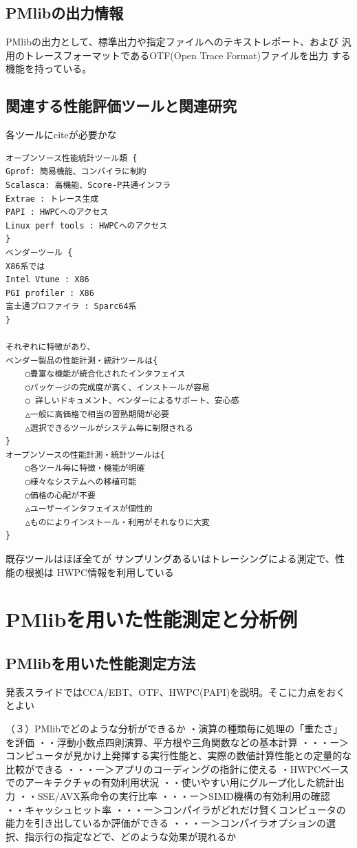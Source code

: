 \documentclass[submit,techrep,noauthor]{ipsj}
\begin{document}
\subsection{PMlibの出力情報}
PMlibの出力として、標準出力や指定ファイルへのテキストレポート、および
汎用のトレースフォーマットであるOTF(Open Trace Format)ファイルを出力
する機能を持っている。


\subsection{関連する性能評価ツールと関連研究}


{ \color{blue} \par
各ツールにciteが必要かな
\par }

\begin{verbatim}
オープンソース性能統計ツール類 {
Gprof: 簡易機能、コンパイラに制約
Scalasca: 高機能、Score-P共通インフラ
Extrae : トレース生成
PAPI : HWPCへのアクセス
Linux perf tools : HWPCへのアクセス
}
ベンダーツール {
X86系では
Intel Vtune : X86
PGI profiler : X86
富士通プロファイラ : Sparc64系
}

それぞれに特徴があり、
ベンダー製品の性能計測・統計ツールは{
	○豊富な機能が統合化されたインタフェイス
	○パッケージの完成度が高く、インストールが容易
	○ 詳しいドキュメント、ベンダーによるサポート、安心感
	△一般に高価格で相当の習熟期間が必要
	△選択できるツールがシステム毎に制限される
}
オープンソースの性能計測・統計ツールは{
	○各ツール毎に特徴・機能が明確
	○様々なシステムへの移植可能
	○価格の心配が不要
	△ユーザーインタフェイスが個性的
	△ものによりインストール・利用がそれなりに大変
}
\end{verbatim}

既存ツールはほぼ全てが
サンプリングあるいはトレーシングによる測定で、性能の根拠は
HWPC情報を利用している

\section{PMlibを用いた性能測定と分析例}


\subsection{PMlibを用いた性能測定方法}

{ \color{blue}
発表スライドではCCA/EBT、OTF、HWPC(PAPI)を説明。そこに力点をおくとよい\\
}

（３）PMlibでどのような分析ができるか
・演算の種類毎に処理の「重たさ」を評価
・・浮動小数点四則演算、平方根や三角関数などの基本計算
・・・ー＞コンピュータが見かけ上発揮する実行性能と、実際の数値計算性能との定量的な比較ができる
・・・ー＞アプリのコーディングの指針に使える
・HWPCベースでのアーキテクチャの有効利用状況
・・使いやすい用にグループ化した統計出力
・・SSE/AVX系命令の実行比率
・・・ー＞SIMD機構の有効利用の確認
・・キャッシュヒット率
・・・ー＞コンパイラがどれだけ賢くコンピュータの能力を引き出しているか評価ができる
・・・ー＞コンパイラオプションの選択、指示行の指定などで、どのような効果が現れるか
\end{document}
